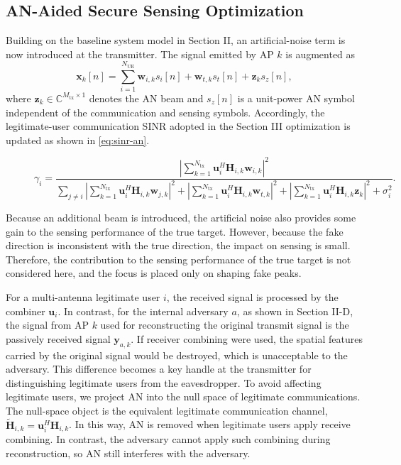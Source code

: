 \documentclass[conference,twocolumn,a4paper]{IEEEtran}
\begin{document}
\subsection{AN-Aided Secure Sensing Optimization}
Building on the baseline system model in Section II, an artificial-noise term is now introduced at the transmitter. The signal emitted by AP $k$ is augmented as
\begin{equation}
\mathbf{x}_k[n]=\sum_{i=1}^{N_{\mathrm{UE}}}\mathbf{w}_{i,k}s_i[n]+\mathbf{w}_{t,k}s_t[n]+\mathbf{z}_ks_z[n],
\label{eq:xk-an}
\end{equation}
where $\mathbf{z}_k\in\mathbb{C}^{M_{\mathrm{tx}}\times 1}$ denotes the AN beam and $s_z[n]$ is a unit-power AN symbol independent of the communication and sensing symbols. Accordingly, the legitimate-user communication SINR adopted in the Section III optimization is updated as shown in \eqref{eq:sinr-an}.
\begin{figure}[!t]
\vspace*{-0.4\baselineskip}
\begin{equation}
\gamma_i=
\frac{\left|\sum_{k=1}^{N_{\mathrm{tx}}}\mathbf{u}_i^H\mathbf{H}_{i,k}\mathbf{w}_{i,k}\right|^2}{\sum_{j\neq i}\left|\sum_{k=1}^{N_{\mathrm{tx}}}\mathbf{u}_i^H\mathbf{H}_{i,k}\mathbf{w}_{j,k}\right|^2+\left|\sum_{k=1}^{N_{\mathrm{tx}}}\mathbf{u}_i^H\mathbf{H}_{i,k}\mathbf{w}_{t,k}\right|^2+\left|\sum_{k=1}^{N_{\mathrm{tx}}}\mathbf{u}_i^H\mathbf{H}_{i,k}\mathbf{z}_k\right|^2+\sigma_i^2}.
\label{eq:sinr-an}
\end{equation}
\vspace*{-1.2\baselineskip}
\end{figure}
Because an additional beam is introduced, the artificial noise also provides some gain to the sensing performance of the true target. However, because the fake direction is inconsistent with the true direction, the impact on sensing is small. Therefore, the contribution to the sensing performance of the true target is not considered here, and the focus is placed only on shaping fake peaks.

For a multi-antenna legitimate user $i$, the received signal is processed by the combiner $\mathbf{u}_i$. In contrast, for the internal adversary $a$, as shown in Section II-D, the signal from AP $k$ used for reconstructing the original transmit signal is the passively received signal $\mathbf{y}_{a,k}$. If receiver combining were used, the spatial features carried by the original signal would be destroyed, which is unacceptable to the adversary. This difference becomes a key handle at the transmitter for distinguishing legitimate users from the eavesdropper. To avoid affecting legitimate users, we project AN into the null space of legitimate communications. The null-space object is the equivalent legitimate communication channel, $\widetilde{\mathbf{H}}_{i,k}=\mathbf{u}_i^H\mathbf{H}_{i,k}$. In this way, AN is removed when legitimate users apply receive combining. In contrast, the adversary cannot apply such combining during reconstruction, so AN still interferes with the adversary.
\end{document}
